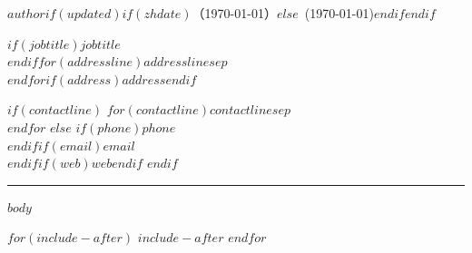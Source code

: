 \documentclass[$if(fontsize)$$fontsize$$else$11pt$endif$,$if(papersize)$$papersize$paper$else$letterpaper$endif$$for(classoption)$,$classoption$$endfor$]{article}
\newlength{\cvindent}
\newlength{\cvcontactwidth}
\newcommand{\cvrule}{\par\noindent\hspace*{-\cvindent}%
  \rule{\dimexpr\textwidth+\cvindent\relax}{0.6pt}\par}
\begin{document}
\noindent\hspace*{-\cvindent}%
\begin{minipage}{\dimexpr\textwidth+\cvindent\relax}
  \raggedright
  {\large\bfseries $author$}$if(updated)$$if(zhdate)${\normalsize （\apstylekinda\today）}$else$\ {\normalsize (\apstylekinda\today)}$endif$$endif$

  \vspace{3pt}

  \noindent\hspace*{\cvindent}%
  \begin{minipage}[t]{\dimexpr\linewidth-\cvindent-\cvcontactwidth-1em\relax}\small\raggedright
    $if(jobtitle)$$jobtitle$\\$endif$$for(addressline)$$addressline$$sep$\\$endfor$$if(address)$$address$$endif$
  \end{minipage}\hfill
  \begin{minipage}[t]{\cvcontactwidth}\small\raggedleft
$if(contactline)$
    $for(contactline)$$contactline$$sep$\\$endfor$
$else$
    $if(phone)$$phone$\\$endif$$if(email)$\href{mailto:$email$}{$email$}\\$endif$$if(web)$\href{https://$web$}{$web$}$endif$
$endif$
  \end{minipage}
\end{minipage}

\vspace{6pt}
\cvrule
\vspace{-6pt}

$body$

$for(include-after)$
$include-after$
$endfor$
\end{document}
